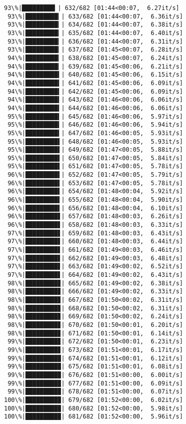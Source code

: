 \documentclass[11pt]{article}
\begin{document}
\begin{Verbatim}[commandchars=\\\{\}]
 93\%|█████████▎| 632/682 [01:44<00:07,  6.27it/s]
 93\%|█████████▎| 633/682 [01:44<00:07,  6.36it/s]
 93\%|█████████▎| 634/682 [01:44<00:07,  6.38it/s]
 93\%|█████████▎| 635/682 [01:44<00:07,  6.40it/s]
 93\%|█████████▎| 636/682 [01:44<00:07,  6.31it/s]
 93\%|█████████▎| 637/682 [01:45<00:07,  6.28it/s]
 94\%|█████████▎| 638/682 [01:45<00:07,  6.24it/s]
 94\%|█████████▎| 639/682 [01:45<00:06,  6.21it/s]
 94\%|█████████▍| 640/682 [01:45<00:06,  6.15it/s]
 94\%|█████████▍| 641/682 [01:45<00:06,  6.09it/s]
 94\%|█████████▍| 642/682 [01:45<00:06,  6.09it/s]
 94\%|█████████▍| 643/682 [01:46<00:06,  6.06it/s]
 94\%|█████████▍| 644/682 [01:46<00:06,  6.06it/s]
 95\%|█████████▍| 645/682 [01:46<00:06,  5.97it/s]
 95\%|█████████▍| 646/682 [01:46<00:06,  5.94it/s]
 95\%|█████████▍| 647/682 [01:46<00:05,  5.93it/s]
 95\%|█████████▌| 648/682 [01:46<00:05,  5.93it/s]
 95\%|█████████▌| 649/682 [01:47<00:05,  5.88it/s]
 95\%|█████████▌| 650/682 [01:47<00:05,  5.84it/s]
 95\%|█████████▌| 651/682 [01:47<00:05,  5.78it/s]
 96\%|█████████▌| 652/682 [01:47<00:05,  5.79it/s]
 96\%|█████████▌| 653/682 [01:47<00:05,  5.78it/s]
 96\%|█████████▌| 654/682 [01:48<00:04,  5.92it/s]
 96\%|█████████▌| 655/682 [01:48<00:04,  5.90it/s]
 96\%|█████████▌| 656/682 [01:48<00:04,  6.10it/s]
 96\%|█████████▋| 657/682 [01:48<00:03,  6.26it/s]
 96\%|█████████▋| 658/682 [01:48<00:03,  6.33it/s]
 97\%|█████████▋| 659/682 [01:48<00:03,  6.43it/s]
 97\%|█████████▋| 660/682 [01:48<00:03,  6.44it/s]
 97\%|█████████▋| 661/682 [01:49<00:03,  6.46it/s]
 97\%|█████████▋| 662/682 [01:49<00:03,  6.48it/s]
 97\%|█████████▋| 663/682 [01:49<00:02,  6.52it/s]
 97\%|█████████▋| 664/682 [01:49<00:02,  6.43it/s]
 98\%|█████████▊| 665/682 [01:49<00:02,  6.38it/s]
 98\%|█████████▊| 666/682 [01:49<00:02,  6.33it/s]
 98\%|█████████▊| 667/682 [01:50<00:02,  6.31it/s]
 98\%|█████████▊| 668/682 [01:50<00:02,  6.31it/s]
 98\%|█████████▊| 669/682 [01:50<00:02,  6.24it/s]
 98\%|█████████▊| 670/682 [01:50<00:01,  6.20it/s]
 98\%|█████████▊| 671/682 [01:50<00:01,  6.14it/s]
 99\%|█████████▊| 672/682 [01:50<00:01,  6.23it/s]
 99\%|█████████▊| 673/682 [01:51<00:01,  6.17it/s]
 99\%|█████████▉| 674/682 [01:51<00:01,  6.12it/s]
 99\%|█████████▉| 675/682 [01:51<00:01,  6.08it/s]
 99\%|█████████▉| 676/682 [01:51<00:00,  6.00it/s]
 99\%|█████████▉| 677/682 [01:51<00:00,  6.09it/s]
 99\%|█████████▉| 678/682 [01:51<00:00,  6.07it/s]
100\%|█████████▉| 679/682 [01:52<00:00,  6.02it/s]
100\%|█████████▉| 680/682 [01:52<00:00,  5.98it/s]
100\%|█████████▉| 681/682 [01:52<00:00,  5.96it/s]
    \end{Verbatim}
\end{document}
